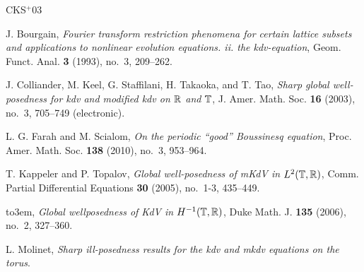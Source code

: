 \documentclass[12pt,reqno]{amsart}
\numberwithin{equation}{section}  %
\begin{document}
        \newcommand{\etalchar}[1]{$^{#1}$}
\providecommand{\bysame}{\leavevmode\hbox to3em{\hrulefill}\thinspace}
\providecommand{\MR}{\relax\ifhmode\unskip\space\fi MR }
\providecommand{\MRhref}[2]{%
  \href{http://www.ams.org/mathscinet-getitem?mr=#1}{#2}
}
\providecommand{\href}[2]{#2}
\begin{thebibliography}{CKS{\etalchar{+}}03}

J. Bourgain, \emph{Fourier transform restriction phenomena for certain
  lattice subsets and applications to nonlinear evolution equations. ii. the
  kdv-equation}, Geom. Funct. Anal. \textbf{3} (1993), no.~3, 209--262.

\bibitem[CKS{\etalchar{+}}03]{Colliander:2003kx}
J. Colliander, M. Keel, G. Staffilani, H. Takaoka, and T. Tao, \emph{Sharp global
  well-posedness for kdv and modified kdv on {$\Bbb R$} and {$\Bbb T$}}, J.
  Amer. Math. Soc. \textbf{16} (2003), no.~3, 705--749 (electronic).

L. G. Farah and M. Scialom, \emph{On the periodic ``good''
  {B}oussinesq equation}, Proc. Amer. Math. Soc. \textbf{138} (2010), no.~3,
  953--964. 

T. Kappeler and P. Topalov, \emph{Global well-posedness of m{K}d{V} in
  {$L^2(\Bbb T,\Bbb R)$}}, Comm. Partial Differential Equations \textbf{30}
  (2005), no.~1-3, 435--449. 

\bysame, \emph{Global wellposedness of {K}d{V} in {$H^{-1}(\Bbb T,\Bbb R)$}},
  Duke Math. J. \textbf{135} (2006), no.~2, 327--360. 

L. Molinet, \emph{Sharp ill-posedness results for the kdv and mkdv equations
  on the torus}.

\end{thebibliography}

%
%
        
\end{document}
